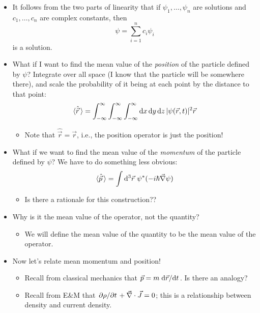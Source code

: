 \documentclass[../notes.tex]{subfiles}
\begin{document}
\begin{itemize}
    \item It follows from the two parts of linearity that if $\psi_1,\dots,\psi_n$ are solutions and $c_1,\dots,c_n$ are complex constants, then
    \begin{equation*}
        \psi = \sum_{i=1}^nc_i\psi_i
    \end{equation*}
    is a solution.
    \item What if I want to find the mean value of the \emph{position} of the particle defined by $\psi$? Integrate over all space (I know that the particle will be somewhere there), and scale the probability of it being at each point by the distance to that point:
    \begin{equation*}
        \langle{\hat{\vec{r}}\,}\rangle = \int_{-\infty}^\infty\int_{-\infty}^\infty\int_{-\infty}^\infty\dd{x}\dd{y}\dd{z}|\psi(\vec{r},t)|^2\vec{r}
    \end{equation*}
    \begin{itemize}
        \item Note that $\hat{\vec{r}}=\vec{r}$, i.e., the position operator is just the position!
    \end{itemize}
    \item What if we want to find the mean value of the \emph{momentum} of the particle defined by $\psi$? We have to do something less obvious:
    \begin{equation*}
        \Exp{\hat{\vec{p}}\,} = \int\dd^3\vec{r}\ \psi^*(-i\hbar\vec{\nabla}\psi)
    \end{equation*}
    \begin{itemize}
        \item Is there a rationale for this construction??
    \end{itemize}
    \item Why is it the mean value of the operator, not the quantity?
    \begin{itemize}
        \item We will define the mean value of the quantity to be the mean value of the operator.
    \end{itemize}
    \item Now let's relate mean momentum and position!
    \begin{itemize}
        \item Recall from classical mechanics that $\vec{p}=m\dv*{\vec{r}}{t}$. Is there an analogy?
        \item Recall from E\&M that $\pdv*{\rho}{t}+\vec{\nabla}\cdot\vec{J}=0$; this is a relationship between density and current density.

\end{itemize}
\end{itemize}
\end{document}
